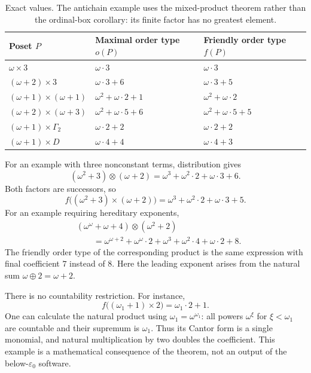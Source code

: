 \documentclass[11pt,letterpaper]{article}
\theoremstyle{definition}
\theoremstyle{remark}
\newcommand{\anti}[1]{\Gamma_{#1}}
\begin{document}
\begin{table}[ht]
\centering\small
\renewcommand{\arraystretch}{1.3}
\begin{tabularx}{\textwidth}{@{}Y Y Y@{}}
\toprule
\textbf{Poset $P$} & \textbf{Maximal order type $o(P)$} & \textbf{Friendly order type $f(P)$}\\
\midrule
$\omega\times3$ & $\omega\cdot3$ & $\omega\cdot3$\\
$(\omega+2)\times3$ & $\omega\cdot3+6$ & $\omega\cdot3+5$\\
$(\omega+1)\times(\omega+1)$ & $\omega^2+\omega\cdot2+1$ & $\omega^2+\omega\cdot2$\\
$(\omega+2)\times(\omega+3)$ & $\omega^2+\omega\cdot5+6$ & $\omega^2+\omega\cdot5+5$\\
$(\omega+1)\times\anti2$ & $\omega\cdot2+2$ & $\omega\cdot2+2$\\
$(\omega+1)\times D$ & $\omega\cdot4+4$ & $\omega\cdot4+3$\\
\bottomrule
\end{tabularx}
\caption{Exact values. The antichain example uses the mixed-product
theorem rather than the ordinal-box corollary: its finite factor has no
greatest element.}
\label{tab:examples}
\end{table}

For an example with three nonconstant terms, distribution gives
\[
 (\omega^2+3)\otimes(\omega+2)
 =\omega^3+\omega^2\cdot2+\omega\cdot3+6.
\]
Both factors are successors, so
\[
 f\bigl((\omega^2+3)\times(\omega+2)\bigr)
 =\omega^3+\omega^2\cdot2+\omega\cdot3+5.
\]
For an example requiring hereditary exponents,
\begin{align*}
 &(\omega^\omega+\omega+4)\otimes(\omega^2+2)\\
 &\qquad=\omega^{\omega+2}+\omega^\omega\cdot2
       +\omega^3+\omega^2\cdot4+\omega\cdot2+8.
\end{align*}
The friendly order type of the corresponding product is the same expression
with final coefficient $7$ instead of $8$. Here the leading exponent
arises from the natural sum $\omega\oplus2=\omega+2$.

There is no countability restriction. For instance,
\[
 f\bigl((\omega_1+1)\times2\bigr)=\omega_1\cdot2+1.
\]
One can calculate the natural product using
$\omega_1=\omega^{\omega_1}$: all powers $\omega^\xi$ for $\xi<\omega_1$
are countable and their supremum is $\omega_1$. Thus its Cantor form is a
single monomial, and natural multiplication by two doubles the coefficient.
This example is a mathematical consequence of the theorem, not an output
of the below-$\varepsilon_0$ software.
\end{document}
